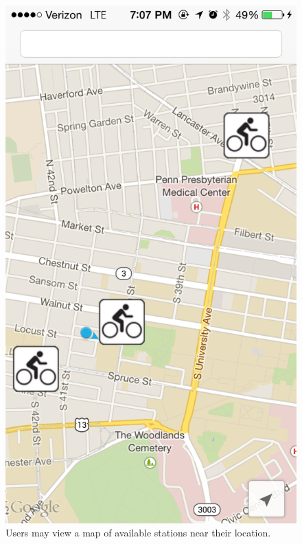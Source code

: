 \documentclass{sig-alternate}
\begin{document}
\begin{figure}[htb!]
\centering
\begin{minipage}[b]{0.46\linewidth}
	\includegraphics[width=1\linewidth]{img_0250}
	\caption{Users may view a map of available stations near their location.}
\label{fig:minipage1}
\end{minipage}
\quad
\begin{minipage}[b]{0.46\linewidth}

\end{minipage}
\end{figure}
\end{document}

